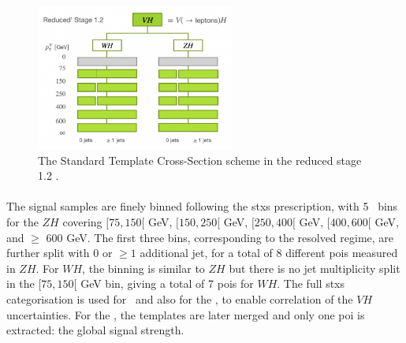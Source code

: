 \begin{figure}[!htbp]
    \centering
    \includegraphics[width=0.58\textwidth]{Images/VH/Model/STXSsketch.png}
    \caption{The Standard Template Cross-Section scheme in the reduced stage 1.2 \cite{berger2019simplified}.}
    \label{fig:model-stxsscheme}
\end{figure}

\paragraph{}The signal samples are finely binned following the \gls{stxs} prescription, with 5 \ptv\ bins for the $ZH$ covering $[75, 150[$ GeV, $[150, 250[$ GeV, $[250, 400[$ GeV, $[400, 600[$ GeV, and $\geq$ 600 GeV. The first three bins, corresponding to the resolved regime, are further split  with 0 or $\geq 1$ additional jet, for a total of 8 different \glspl{poi} measured in $ZH$. For $WH$, the binning is similar to $ZH$ but there is no jet multiplicity split in the $[75, 150[$ GeV bin, giving a total of 7 \glspl{poi} for $WH$. The full \gls{stxs} categorisation is used for \vhb\ and also for the \vhc, to enable correlation of the $VH$ uncertainties. For the \vhc, the templates are later merged and only one \gls{poi} is extracted: the global signal strength.\\
  
